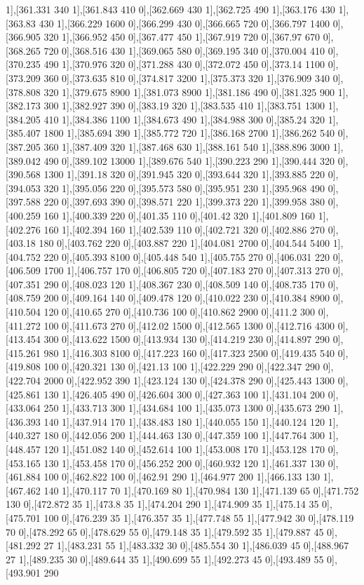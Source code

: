 {1],[361.331 340 1],[361.843 410 0],[362.669 430 1],[362.725 490 1],[363.176 430 1],[363.83 430 1],[366.229 1600 0],[366.299 430 0],[366.665 720 0],[366.797 1400 0],[366.905 320 1],[366.952 450 0],[367.477 450 1],[367.919 720 0],[367.97 670 0],[368.265 720 0],[368.516 430 1],[369.065 580 0],[369.195 340 0],[370.004 410 0],[370.235 490 1],[370.976 320 0],[371.288 430 0],[372.072 450 0],[373.14 1100 0],[373.209 360 0],[373.635 810 0],[374.817 3200 1],[375.373 320 1],[376.909 340 0],[378.808 320 1],[379.675 8900 1],[381.073 8900 1],[381.186 490 0],[381.325 900 1],[382.173 300 1],[382.927 390 0],[383.19 320 1],[383.535 410 1],[383.751 1300 1],[384.205 410 1],[384.386 1100 1],[384.673 490 1],[384.988 300 0],[385.24 320 1],[385.407 1800 1],[385.694 390 1],[385.772 720 1],[386.168 2700 1],[386.262 540 0],[387.205 360 1],[387.409 320 1],[387.468 630 1],[388.161 540 1],[388.896 3000 1],[389.042 490 0],[389.102 13000 1],[389.676 540 1],[390.223 290 1],[390.444 320 0],[390.568 1300 1],[391.18 320 0],[391.945 320 0],[393.644 320 1],[393.885 220 0],[394.053 320 1],[395.056 220 0],[395.573 580 0],[395.951 230 1],[395.968 490 0],[397.588 220 0],[397.693 390 0],[398.571 220 1],[399.373 220 1],[399.958 380 0],[400.259 160 1],[400.339 220 0],[401.35 110 0],[401.42 320 1],[401.809 160 1],[402.276 160 1],[402.394 160 1],[402.539 110 0],[402.721 320 0],[402.886 270 0],[403.18 180 0],[403.762 220 0],[403.887 220 1],[404.081 2700 0],[404.544 5400 1],[404.752 220 0],[405.393 8100 0],[405.448 540 1],[405.755 270 0],[406.031 220 0],[406.509 1700 1],[406.757 170 0],[406.805 720 0],[407.183 270 0],[407.313 270 0],[407.351 290 0],[408.023 120 1],[408.367 230 0],[408.509 140 0],[408.735 170 0],[408.759 200 0],[409.164 140 0],[409.478 120 0],[410.022 230 0],[410.384 8900 0],[410.504 120 0],[410.65 270 0],[410.736 100 0],[410.862 2900 0],[411.2 300 0],[411.272 100 0],[411.673 270 0],[412.02 1500 0],[412.565 1300 0],[412.716 4300 0],[413.454 300 0],[413.622 1500 0],[413.934 130 0],[414.219 230 0],[414.897 290 0],[415.261 980 1],[416.303 8100 0],[417.223 160 0],[417.323 2500 0],[419.435 540 0],[419.808 100 0],[420.321 130 0],[421.13 100 1],[422.229 290 0],[422.347 290 0],[422.704 2000 0],[422.952 390 1],[423.124 130 0],[424.378 290 0],[425.443 1300 0],[425.861 130 1],[426.405 490 0],[426.604 300 0],[427.363 100 1],[431.104 200 0],[433.064 250 1],[433.713 300 1],[434.684 100 1],[435.073 1300 0],[435.673 290 1],[436.393 140 1],[437.914 170 1],[438.483 180 1],[440.055 150 1],[440.124 120 1],[440.327 180 0],[442.056 200 1],[444.463 130 0],[447.359 100 1],[447.764 300 1],[448.457 120 1],[451.082 140 0],[452.614 100 1],[453.008 170 1],[453.128 170 0],[453.165 130 1],[453.458 170 0],[456.252 200 0],[460.932 120 1],[461.337 130 0],[461.884 100 0],[462.822 100 0],[462.91 290 1],[464.977 200 1],[466.133 130 1],[467.462 140 1],[470.117 70 1],[470.169 80 1],[470.984 130 1],[471.139 65 0],[471.752 130 0],[472.872 35 1],[473.8 35 1],[474.204 290 1],[474.909 35 1],[475.14 35 0],[475.701 100 0],[476.239 35 1],[476.357 35 1],[477.748 55 1],[477.942 30 0],[478.119 70 0],[478.292 65 0],[478.629 55 0],[479.148 35 1],[479.592 35 1],[479.887 45 0],[481.292 27 1],[483.231 55 1],[483.332 30 0],[485.554 30 1],[486.039 45 0],[488.967 27 1],[489.235 30 0],[489.644 35 1],[490.699 55 1],[492.273 45 0],[493.489 55 0],[493.901 290 }
